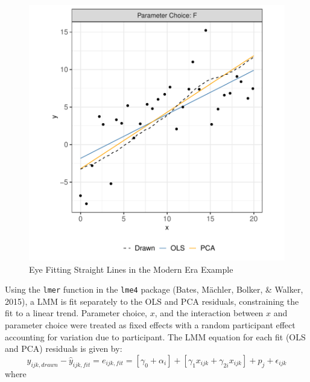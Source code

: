\documentclass[print]{nuthesis}
\begin{document}
\begin{figure}
\includegraphics[width=1\linewidth]{thesis_files/figure-latex/eyefitting-example-plot-1} \caption{Eye Fitting Straight Lines in the Modern Era Example}\label{fig:eyefitting-example-plot}
\end{figure}

Using the \texttt{lmer} function in the \texttt{lme4} package (Bates, Mächler, Bolker, \& Walker, 2015), a LMM is fit separately to the OLS and PCA residuals, constraining the fit to a linear trend.
Parameter choice, \(x\), and the interaction between \(x\) and parameter choice were treated as fixed effects with a random participant effect accounting for variation due to participant.
The LMM equation for each fit (OLS and PCA) residuals is given by:
\begin{equation}
y_{ijk,drawn} - \hat y_{ijk,fit} = e_{ijk,fit} = \left[\gamma_0 + \alpha_i\right] + \left[\gamma_{1} x_{ijk} + \gamma_{2i} x_{ijk}\right] + p_{j} + \epsilon_{ijk}
\end{equation}
\noindent where
\end{document}
